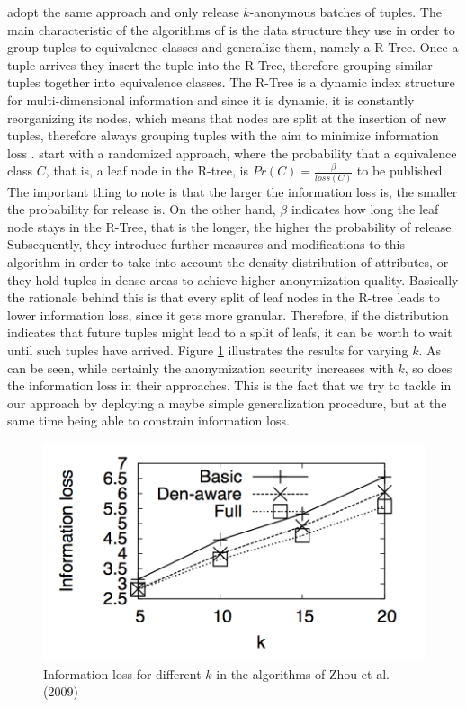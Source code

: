  adopt the same approach and only release $k$-anonymous batches of tuples. The main characteristic of the algorithms of  is the data structure they use in order to group tuples to equivalence classes and generalize them, namely a R-Tree. Once a tuple arrives they insert the tuple into the R-Tree, therefore grouping similar tuples together into equivalence classes. The R-Tree is a dynamic index structure for multi-dimensional information and since it is dynamic, it is constantly reorganizing its nodes, which means that nodes are split at the insertion of new tuples, therefore always grouping tuples with the aim to minimize information loss \cite{guttman1984}.  start with a randomized approach, where the probability that a equivalence class $C$, that is, a leaf node in the R-tree, is $Pr(C)=\frac{\beta}{loss(C)}$ to be published. The important thing to note is that the larger the information loss is, the smaller the probability for release is. On the other hand, $\beta$ indicates how long the leaf node stays in the R-Tree, that is the longer, the higher the probability of release. Subsequently, they introduce further measures and modifications to this algorithm in order to take into account the density distribution of attributes, or they hold tuples in dense areas to achieve higher anonymization quality. Basically the rationale behind this is that every split of leaf nodes in the R-tree leads to lower information loss, since it gets more granular. Therefore, if the distribution indicates that future tuples might lead to a split of leafs, it can be worth to wait until such tuples have arrived. Figure \ref{fig:cppp_result} illustrates the results for varying $k$. As can be seen, while certainly the anonymization security increases with $k$, so does the information loss in their approaches. This is the fact that we try to tackle in our approach by deploying a maybe simple generalization procedure, but at the same time being able to constrain information loss.

\begin{figure}[H]
    \centering
    \includegraphics[scale=0.5]{Images/Cppp_k_anony_result.png}
    \caption{Information loss for different $k$ in the algorithms of Zhou et al. (2009)}
    \label{fig:cppp_result}
\end{figure}

